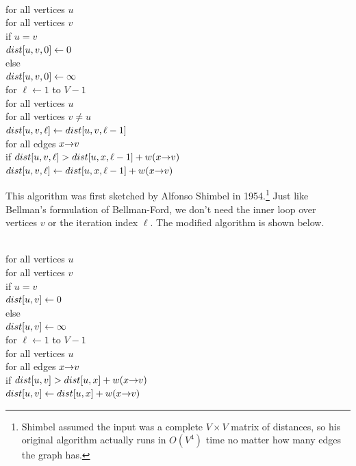 \begin{pseudocode}
\\
for all vertices $u$\\
\Indent for all vertices $v$\\
\Indent\Indent if $u = v$\\
\Indent\Indent\Indent $dist[u, v, 0] \gets 0$\\
\Indent\Indent else\\
\Indent\Indent\Indent $dist[u, v, 0] \gets \infty$\\
for $\ell \gets 1$ to $V - 1$\\
\Indent for all vertices $u$\\
\Indent\Indent for all vertices $v \neq u$\\
\Indent\Indent\Indent $dist[u, v, \ell] \gets dist[u, v, \ell - 1]$\\
\Indent\Indent\Indent for all edges $x\mathord{\rightarrow}v$\\
\Indent\Indent\Indent\Indent if $dist[u, v, \ell] > dist[u, x, \ell - 1] + w(x\mathord{\rightarrow}v)$\\
\Indent\Indent\Indent\Indent\Indent $dist[u, v, \ell] \gets dist[u, x, \ell - 1] + w(x\mathord{\rightarrow}v)$
\end{pseudocode}

This algorithm was first sketched by Alfonso Shimbel in 1954.\footnote{Shimbel assumed the input was a complete $V \times V$ matrix of distances, so his original algorithm actually runs in $O(V^4)$ time no matter how many edges the graph has.}
Just like Bellman’s formulation of Bellman-Ford, we don’t need the inner loop over vertices $v$ or the iteration index $\ell$.
The modified algorithm is shown below.

\begin{pseudocode}
\\
for all vertices $u$\\
\Indent for all vertices $v$\\
\Indent\Indent if $u = v$\\
\Indent\Indent\Indent $dist[u, v] \gets 0$\\
\Indent\Indent else\\
\Indent\Indent\Indent $dist[u, v] \gets \infty$\\
for $\ell \gets 1$ to $V - 1$\\
\Indent for all vertices $u$\\
\Indent\Indent for all edges $x\mathord{\rightarrow}v$\\
\Indent\Indent\Indent if $dist[u, v] > dist[u, x] + w(x\mathord{\rightarrow}v)$\\
\Indent\Indent\Indent\Indent $dist[u, v] \gets dist[u, x] + w(x\mathord{\rightarrow}v)$
\end{pseudocode}

